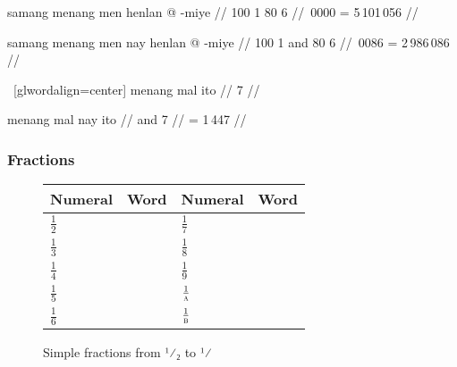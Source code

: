 \pex[glwordalign=center]\label{ex:numconfuse}
\a\begingl
	\gla samang menang men henlan @ -miye //
	 {100} {1} {80} {6} //
	\,0000 = 5\,101\,056 //
\endgl

\a\begingl
	\gla samang menang men nay henlan @ -miye //
	 {100} {1} and {80} {6} //
	\,0086 = 2\,986\,086 //
\endgl

\xe

\pex~[glwordalign=center]\label{ex:numsgldig}
\a\ljudge\ques\begingl
	\gla menang mal ito //
	 {\ten} {7} //
\endgl

\a\begingl
	\gla menang mal nay ito //
	 {\ten} and {7} //
	\glft {} = 1\,447 //
\endgl

\xe


\subsubsection{Fractions}

\begin{figure}[tp]\centering
\caption[Simple fractions from $\frac{1}{2}$ to $\frac{1}{\elv}$]{Simple 
fractions from ¹⁄₂ to ¹⁄\tsub{\elv}}
\begin{tabu} to .75\linewidth {X[1c] X[2c] X[1c] X[2c]}
\toprule\tableheaderfont
Numeral
	& Word
	& Numeral
	& Word
	\\
\toprule

$\frac{1}{2}$ & 
& $\frac{1}{7}$ &  \\ [.25\baselineskip]

$\frac{1}{3}$ & 
& $\frac{1}{8}$ &  \\ [.25\baselineskip]

$\frac{1}{4}$ & 
& $\frac{1}{9}$ &  \\ [.25\baselineskip]

$\frac{1}{5}$ & 
& $\frac{1}{\textsc{a}}$ &  \\ [.25\baselineskip]

$\frac{1}{6}$ & 
& $\frac{1}{\elv}$ &  \\

\bottomrule
\end{tabu}
\label{tab:smallfrac}
\end{figure}

